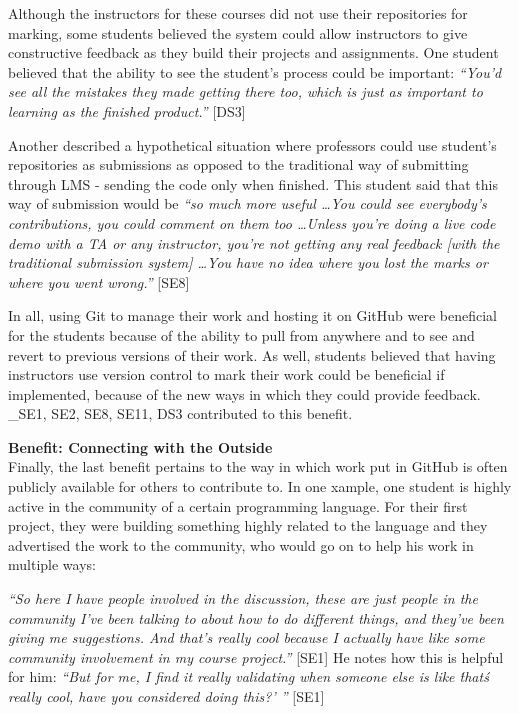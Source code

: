 Although the instructors for these courses did not use their repositories for marking, some students believed the system could allow instructors to give constructive feedback as they build their projects and assignments. One student believed that the ability to see the student's process could be important: \textit{``You'd see all the mistakes they made getting there too, which is just as important to learning as the finished product.''} [DS3]

Another described a hypothetical situation where professors could use student's repositories as submissions as opposed to the traditional way of submitting through LMS - sending the code only when finished. This student said that this way of submission would be \textit{``so much more useful \ldots You could see everybody's contributions, you could comment on them too \ldots Unless you're doing a live code demo with a TA or any instructor, you're not getting any real feedback [with the traditional submission system] \ldots You have no idea where you lost the marks or where you went wrong.''} [SE8]

In all, using Git to manage their work and hosting it on GitHub were beneficial for the students because of the ability to pull from anywhere and to see and revert to previous versions of their work. As well, students believed that having instructors use version control to mark their work could be beneficial if implemented, because of the new ways in which they could provide feedback. _{SE1, SE2, SE8, SE11, DS3} contributed to this benefit.

\textbf{Benefit: Connecting with the Outside} \\
Finally, the last benefit pertains to the way in which work put in GitHub is often publicly available for others to contribute to. In one xample, one student is highly active in the community of a certain programming language. For their first project, they were building something highly related to the language and they advertised the work to the community, who would go on to help his work in multiple ways:

\textit{``So here I have people involved in the discussion, these are just people in the community I've been talking to about how to do different things, and they've been giving me suggestions. And that's really cool because I actually have like some community involvement in my course project.''} [SE1] He notes how this is helpful for him: \textit{``But for me, I find it really validating when someone else is like \'that\'s really cool, have you considered doing this?' ''} [SE1]


